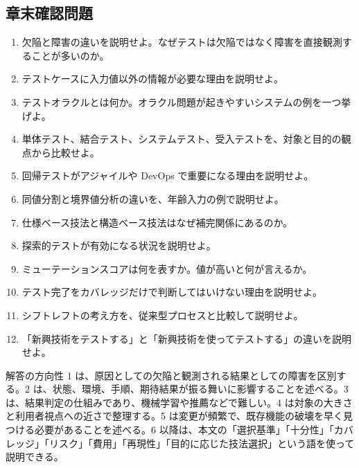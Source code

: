 \subsection{章末確認問題}
\begin{enumerate}[leftmargin=2em]
\item 欠陥と障害の違いを説明せよ。なぜテストは欠陥ではなく障害を直接観測することが多いのか。
\item テストケースに入力値以外の情報が必要な理由を説明せよ。
\item テストオラクルとは何か。オラクル問題が起きやすいシステムの例を一つ挙げよ。
\item 単体テスト、結合テスト、システムテスト、受入テストを、対象と目的の観点から比較せよ。
\item 回帰テストがアジャイルや DevOps で重要になる理由を説明せよ。
\item 同値分割と境界値分析の違いを、年齢入力の例で説明せよ。
\item 仕様ベース技法と構造ベース技法はなぜ補完関係にあるのか。
\item 探索的テストが有効になる状況を説明せよ。
\item ミューテーションスコアは何を表すか。値が高いと何が言えるか。
\item テスト完了をカバレッジだけで判断してはいけない理由を説明せよ。
\item シフトレフトの考え方を、従来型プロセスと比較して説明せよ。
\item 「新興技術をテストする」と「新興技術を使ってテストする」の違いを説明せよ。
\end{enumerate}

\begin{pointbox}{解答の方向性}
1 は、原因としての欠陥と観測される結果としての障害を区別する。2 は、状態、環境、手順、期待結果が振る舞いに影響することを述べる。3 は、結果判定の仕組みであり、機械学習や推薦などで難しい。4 は対象の大きさと利用者視点への近さで整理する。5 は変更が頻繁で、既存機能の破壊を早く見つける必要があることを述べる。6 以降は、本文の「選択基準」「十分性」「カバレッジ」「リスク」「費用」「再現性」「目的に応じた技法選択」という語を使って説明できる。
\end{pointbox}
